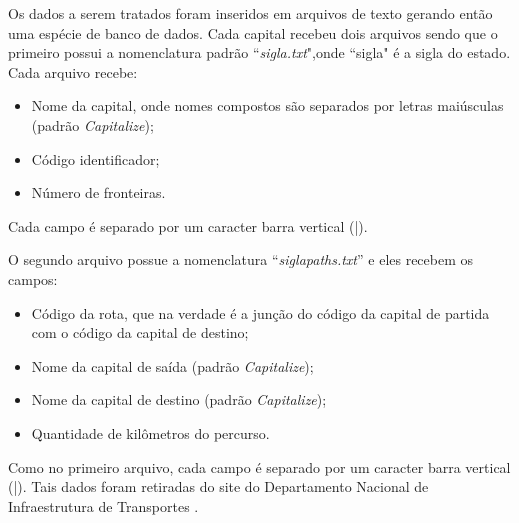 Os dados a serem tratados foram inseridos em arquivos de texto gerando então uma espécie de banco de dados. Cada
capital recebeu dois arquivos sendo que o primeiro possui a nomenclatura padrão ``\textit{sigla.txt}",onde ``sigla" é a sigla do estado. Cada arquivo recebe:

\begin{itemize}
 	\item Nome da capital, onde nomes compostos são separados por letras maiúsculas (padrão \textit{Capitalize});
  \item Código identificador;
	\item Número de fronteiras.
\end{itemize}

Cada campo é separado por um caracter barra vertical (|).

O segundo arquivo possue a nomenclatura ``\textit{sigla\underline{\hspace{.1in}}paths.txt}'' e eles recebem os campos:

\begin{itemize}
	\item Código da rota, que na verdade é a junção do código da capital de partida com o código da capital de destino;
	\item Nome da capital de saída (padrão \textit{Capitalize});
	\item Nome da capital de destino (padrão \textit{Capitalize});
	\item Quantidade de kilômetros do percurso.
\end{itemize}

Como no primeiro arquivo, cada campo é separado por um caracter barra vertical (|). Tais dados foram retiradas do site do Departamento Nacional de Infraestrutura de Transportes \cite{DNIT}.

